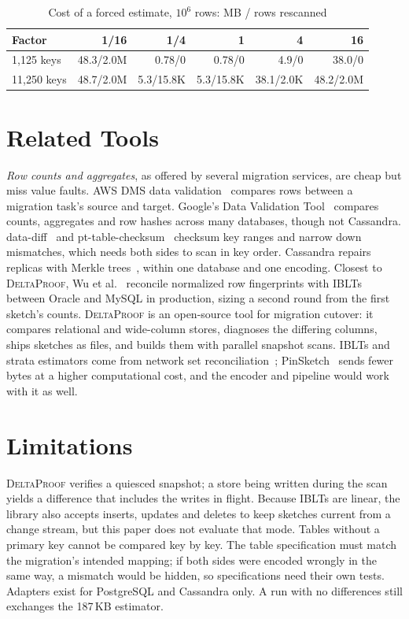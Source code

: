 \documentclass[conference]{IEEEtran}
\newcommand{\sys}{\textsc{DeltaProof}}
\begin{document}
\begin{table}[t]
\caption{Cost of a forced estimate, $10^6$ rows: MB / rows rescanned}
\label{tab:sens}
\centering\footnotesize
\setlength{\tabcolsep}{2pt}
\begin{tabular}{@{}lrrrrr@{}}
\toprule
Factor & 1/16 & 1/4 & 1 & 4 & 16\\
\midrule
1{,}125 keys & 48.3/2.0M & 0.78/0 & 0.78/0 & 4.9/0 & 38.0/0\\
11{,}250 keys & 48.7/2.0M & 5.3/15.8K & 5.3/15.8K & 38.1/2.0K & 48.2/2.0M\\
\bottomrule
\end{tabular}
\end{table}

\section{Related Tools}
\emph{Row counts and aggregates}, as offered by several migration services, are cheap but miss value faults. AWS DMS data validation~\cite{awsdms} compares rows between a migration task's source and target. Google's Data Validation Tool~\cite{dvt} compares counts, aggregates and row hashes across many databases, though not Cassandra. data-diff~\cite{datadiff} and pt-table-checksum~\cite{ptchecksum} checksum key ranges and narrow down mismatches, which needs both sides to scan in key order. Cassandra repairs replicas with Merkle trees~\cite{lakshman2010}, within one database and one encoding. Closest to \sys{}, Wu et al.~\cite{wu2026} reconcile normalized row fingerprints with IBLTs between Oracle and MySQL in production, sizing a second round from the first sketch's counts. \sys{} is an open-source tool for migration cutover: it compares relational and wide-column stores, diagnoses the differing columns, ships sketches as files, and builds them with parallel snapshot scans. IBLTs and strata estimators come from network set reconciliation~\cite{goodrich2011,eppstein2011}; PinSketch~\cite{minisketch} sends fewer bytes at a higher computational cost, and the encoder and pipeline would work with it as well.

\section{Limitations}
\sys{} verifies a quiesced snapshot; a store being written during the scan yields a difference that includes the writes in flight. Because IBLTs are linear, the library also accepts inserts, updates and deletes to keep sketches current from a change stream, but this paper does not evaluate that mode. Tables without a primary key cannot be compared key by key. The table specification must match the migration's intended mapping; if both sides were encoded wrongly in the same way, a mismatch would be hidden, so specifications need their own tests. Adapters exist for PostgreSQL and Cassandra only. A run with no differences still exchanges the 187\,KB estimator.
\end{document}
